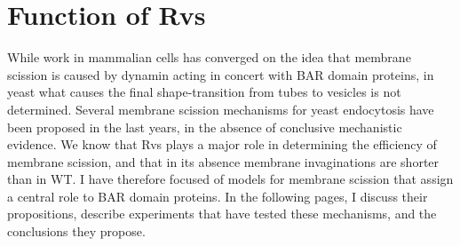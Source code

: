 		
\section{Function of Rvs}


While work in mammalian cells has converged on the idea that membrane scission is caused by dynamin acting in concert with BAR domain proteins, in yeast what causes the final shape-transition from tubes to vesicles is not determined. Several membrane scission mechanisms for yeast endocytosis have been proposed in the last years, in the absence of conclusive mechanistic evidence. We know that Rvs plays a major role in determining the efficiency of membrane scission, and that in its absence membrane invaginations are shorter than in WT. I have therefore focused of models for membrane scission that assign a central role to BAR domain proteins. In the following pages, I discuss their propositions, describe experiments that have tested these mechanisms, and the conclusions they propose. 



